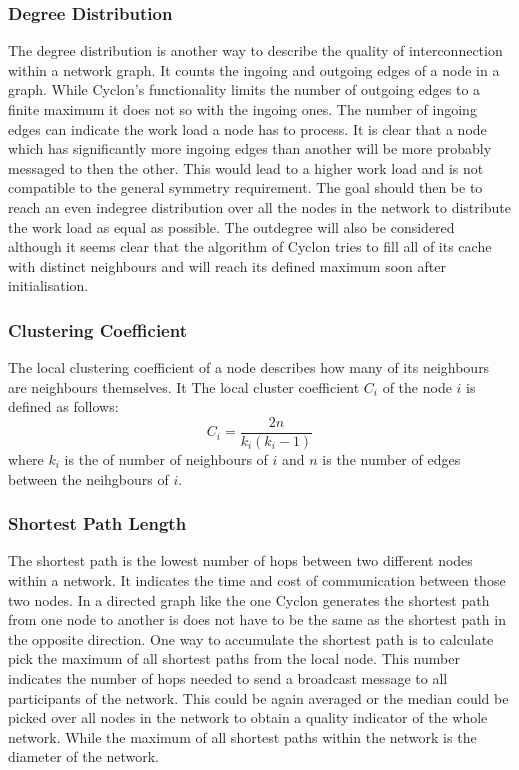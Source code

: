 \subsubsection{Degree Distribution}
The degree distribution is another way to describe the quality of
interconnection within a network graph. It counts the ingoing and outgoing edges
of a node in a graph. While Cyclon's functionality limits the number of outgoing
edges to a finite maximum it does not so with the ingoing ones. The number of
ingoing edges can indicate the work load a node has to process. It is clear that
a node which has significantly more ingoing edges than another will be more
probably messaged to then the other. This would lead to a higher work load and
is not compatible to the general symmetry requirement. The goal should then be
to reach an even indegree distribution over all the nodes in the network to
distribute the work load as equal as possible. The outdegree will also be
considered although it seems clear that the algorithm of Cyclon tries to fill
all of its cache with distinct neighbours and will reach its defined maximum
soon after initialisation.
\subsubsection{Clustering Coefficient}
The local clustering coefficient of a node describes how many of its neighbours
are neighbours themselves. It  The local cluster coefficient $C_i$ of the node
$i$ is defined as follows:
\[C_i = \frac{2n}{k_i(k_i-1)}\]
where $k_i$ is the of number of neighbours of $i$ and $n$ is the number of edges
between the neihgbours of $i$.

\subsubsection{Shortest Path Length}
The shortest path is the lowest number of hops between two different nodes
within a network. It indicates the time and cost of communication between those
two nodes. In a directed graph like the one Cyclon generates the shortest path
from one node to another is does not have to be the same as the shortest path in
the opposite direction. One way to accumulate the shortest path is to calculate
pick the maximum of all shortest paths from the local node. This number
indicates the number of hops needed to send a broadcast message to all
participants of the network. This could be again averaged or the median could be
picked over all nodes in the network to obtain a quality indicator of the whole
network. While the maximum of all shortest paths within the network is the
diameter of the network.
